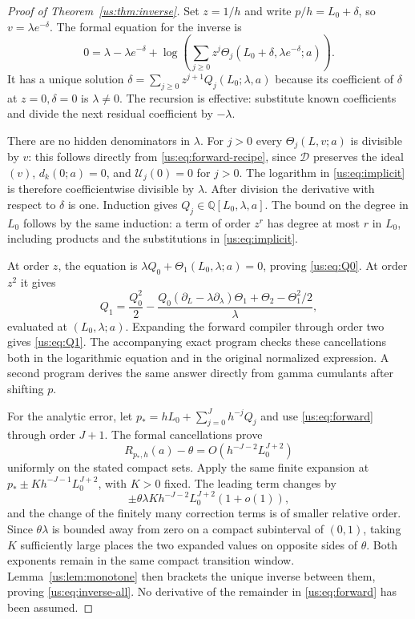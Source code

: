 \begin{proof}[Proof of Theorem~\ref{us:thm:inverse}]
Set $z=1/h$ and write $p/h=L_0+\delta$, so $v=\lambda e^{-\delta}$.
The formal equation for the inverse is
\begin{equation}\label{us:eq:implicit}
 0=\lambda-\lambda e^{-\delta}
   +\log\!\left(
        \sum_{j\ge0}z^j
          \Theta_j(L_0+\delta,\lambda e^{-\delta};a)\right).
\end{equation}
It has a unique solution
$\delta=\sum_{j\ge0}z^{j+1}Q_j(L_0;\lambda,a)$ because its
coefficient of $\delta$ at $z=0,\delta=0$ is $\lambda\ne0$.
The recursion is effective: substitute known coefficients and divide
the next residual coefficient by $-\lambda$.

There are no hidden denominators in $\lambda$. For $j>0$ every
$\Theta_j(L,v;a)$ is divisible by $v$: this follows directly
from \eqref{us:eq:forward-recipe}, since $\mathcal D$ preserves
the ideal $(v)$, $d_k(0;a)=0$, and $\mathcal U_j(0)=0$ for $j>0$.
The logarithm in
\eqref{us:eq:implicit} is therefore coefficientwise divisible by
$\lambda$. After division the derivative with respect to $\delta$
is one. Induction gives $Q_j\in\mathbb Q[L_0,\lambda,a]$.
The bound on the degree in $L_0$ follows by the same induction:
a term of order $z^r$ has degree at most $r$ in $L_0$, including
products and the substitutions in \eqref{us:eq:implicit}.

At order $z$, the equation is
$\lambda Q_0+\Theta_1(L_0,\lambda;a)=0$, proving
\eqref{us:eq:Q0}. At order $z^2$ it gives
\[
 Q_1=\frac{Q_0^2}{2}
  -\frac{
     Q_0(\partial_L-\lambda\partial_\lambda)\Theta_1
       +\Theta_2-\Theta_1^2/2}{\lambda},
\]
evaluated at $(L_0,\lambda;a)$. Expanding the forward compiler
through order two gives \eqref{us:eq:Q1}. The accompanying exact
program checks these cancellations both in the logarithmic equation
and in the original normalized expression. A second program derives
the same answer directly from gamma cumulants after shifting $p$.

For the analytic error, let
$p_* = hL_0+\sum_{j=0}^Jh^{-j}Q_j$ and use
\eqref{us:eq:forward} through order $J+1$. The formal
cancellations prove
\[
 R_{p_*,h}(a)-\theta
 =O\!\left(h^{-J-2}L_0^{J+2}\right)
\]
uniformly on the stated compact sets. Apply the same finite expansion
at $p_*\pm K h^{-J-1}L_0^{J+2}$, with $K>0$ fixed.
The leading term changes by
\[
 \pm\theta\lambda K h^{-J-2}L_0^{J+2}(1+o(1)),
\]
and the change of the finitely many correction terms is of smaller
relative order. Since $\theta\lambda$ is bounded away from zero
on a compact subinterval of $(0,1)$, taking $K$ sufficiently large
places the two expanded values on opposite sides of $\theta$.
Both exponents remain in the same compact transition window.
Lemma~\ref{us:lem:monotone} then brackets the unique inverse
between them, proving \eqref{us:eq:inverse-all}. No derivative of
the remainder in \eqref{us:eq:forward} has been assumed.
\end{proof}

